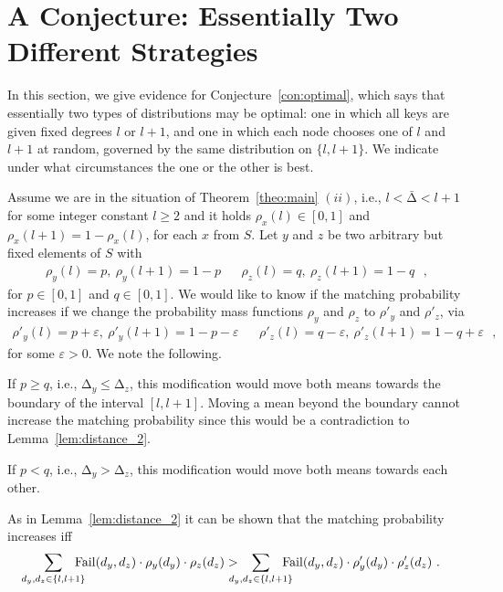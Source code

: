\let\accentvec\vec \documentclass{llncs}
\newcommand{\degr}{\ensuremath{d}}
\newcommand{\pmf}{\ensuremath{{\rho}}}
\newcommand{\mean}{{\mathrm{\scriptstyle\Delta}}}
\newcommand{\Amean}{\bar{\mean}}
\newcommand{\eps}{\ensuremath{\varepsilon}}
\newcommand{\blank}{\text{ }}
\newcommand{\low}{\ensuremath{l}}
\newcommand{\Fail}{\mathrm{Fail}}
\newcommand{\mgap}{\hspace{-1em}}
\begin{document}
\section{A Conjecture: Essentially Two Different Strategies}
In this section, we give evidence for Conjecture~\ref{con:optimal}, which says that
essentially two types of distributions may be optimal:
one in which all keys are given fixed degrees $\low$ or $\low+1$,
and one in which each node chooses one of $\low$ and $\low+1$ at random, governed by the same
distribution on $\{\low,\low+1\}$. We indicate under what circumstances the one or the other is best.

Assume we are in the situation of Theorem~\ref{theo:main} $(ii)$, i.e., $\low<\Amean<\low+1$ for
some integer constant $\low\geq2$ and it holds $\pmf_x(\low)\in[0,1]$ and $\pmf_x(\low+1)=1-\pmf_x(\low)$, for each $x$ from $S$.
Let $y$ and $z$ be two arbitrary but fixed elements of $S$ with 
\begin{align*}
\pmf_y(\low)=p, \ \pmf_y(\low+1)=1-p && \pmf_z(\low)=q, \ \pmf_z(\low+1)=1-q \blank,
\end{align*}
for $p\in [0,1]$ and $q\in[0,1]$. We would like to know if the matching probability increases
if we change the probability mass functions $\pmf_y$ and $\pmf_z$  to $\pmf'_y$ and $\pmf'_z$, via
\begin{align*}
\pmf'_y(\low)=p+\eps, \ \pmf'_y(\low+1)=1-p-\eps && \pmf'_z(\low)=q-\eps, \ \pmf'_z(\low+1)=1-q+\eps \blank,
\end{align*}
for some $\eps > 0$. 
We note the following.
\begin{compactenum}
\item If $p\geq q$, i.e., $\mean_y\leq \mean_z$, this modification would
move both means towards the boundary of the interval $[\low,\low+1]$. Moving a mean beyond
the boundary cannot increase the matching probability since this would be a contradiction to Lemma~\ref{lem:distance_2}.
\item If $p< q$, i.e., $\mean_y> \mean_z$, this modification would
move both means towards each other.
\end{compactenum}
As in Lemma~\ref{lem:distance_2} it can be shown that the matching probability increases iff\begin{align*}
   \sum_{\degr_y,\degr_z\in\{\low,\low+1\}} \mgap\Fail(\degr_y,\degr_z) \cdot \rho_y(\degr_y)\cdot\rho_z(\degr_z) 
 &>\mgap \sum_{\degr_y,\degr_z\in\{\low,\low+1\}}\mgap \Fail(\degr_y,\degr_z) \cdot \rho'_y(\degr_y)\cdot\rho'_z(\degr_z) \blank.
\end{align*}
\end{document}
